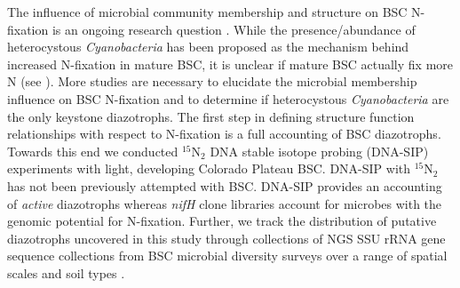 The influence of microbial community membership and structure on BSC
N-fixation is an ongoing research question \citep{Belnap28062013}.
While the presence/abundance of heterocystous \textit{Cyanobacteria}
has been proposed as the mechanism behind increased N-fixation in
mature BSC, it is unclear if mature BSC actually fix more N (see
\citet{15643930}). More studies are necessary to elucidate the
microbial membership influence on BSC N-fixation and to determine if
heterocystous \textit{Cyanobacteria} are the only keystone diazotrophs.
The first step in defining structure function relationships with
respect to N-fixation is a full accounting of BSC diazotrophs. Towards
this end we conducted $^{15}$N$_{2}$ DNA stable isotope probing
(DNA-SIP) experiments with light, developing Colorado Plateau BSC.
DNA-SIP with $^{15}$N$_{2}$ has not been previously attempted with BSC. DNA-SIP
provides an accounting of \textit{active} diazotrophs whereas \textit{nifH}
clone libraries account for microbes with the genomic potential for N-fixation.
Further, we track the distribution of putative diazotrophs uncovered in this
study through collections of NGS SSU rRNA gene sequence collections from BSC
microbial diversity surveys over a range of spatial scales and soil types
\citep{Garcia_Pichel_2013, Steven_2013}. 
